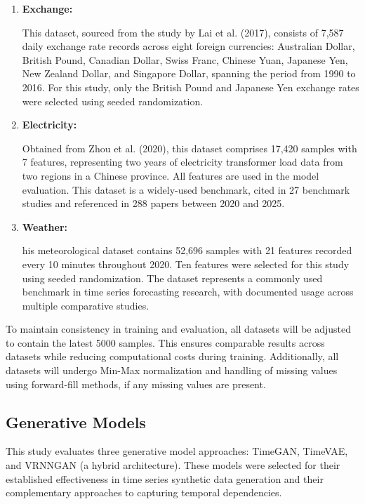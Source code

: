 \documentclass{article}
\begin{document}
\begin{enumerate}
    \item \textbf{Exchange:} 
    
    This dataset, sourced from the study by Lai et al. (2017), consists of 7,587 daily exchange rate records across eight foreign currencies: Australian Dollar, British Pound, Canadian Dollar, Swiss Franc, Chinese Yuan, Japanese Yen, New Zealand Dollar, and Singapore Dollar, spanning the period from 1990 to 2016. For this study, only the British Pound and Japanese Yen exchange rates were selected using seeded randomization.

    \item \textbf{Electricity:} 
    
    Obtained from Zhou et al. (2020), this dataset comprises 17,420 samples with 7 features, representing two years of electricity transformer load data from two regions in a Chinese province. All features are used in the model evaluation. This dataset is a widely-used benchmark, cited in 27 benchmark studies and referenced in 288 papers between 2020 and 2025.

    \item \textbf{Weather:} 

    his meteorological dataset contains 52,696 samples with 21 features recorded every 10 minutes throughout 2020. Ten features were selected for this study using seeded randomization. The dataset represents a commonly used benchmark in time series forecasting research, with documented usage across multiple comparative studies.

\end{enumerate}

To maintain consistency in training and evaluation, all datasets will be adjusted to contain the latest 5000 samples. This ensures comparable results across datasets while reducing computational costs during training. Additionally, all datasets will undergo Min-Max normalization and handling of missing values using forward-fill methods, if any missing values are present.

\subsection{Generative Models}
This study evaluates three generative model approaches: TimeGAN, TimeVAE, and VRNNGAN (a hybrid architecture). These models were selected for their established effectiveness in time series synthetic data generation and their complementary approaches to capturing temporal dependencies.
\end{document}
